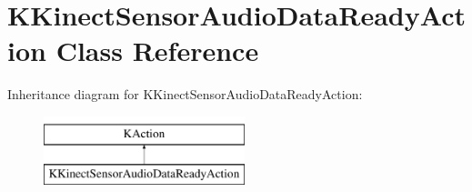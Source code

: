 \hypertarget{class_k_kinect_sensor_audio_data_ready_action}{\section{\-K\-Kinect\-Sensor\-Audio\-Data\-Ready\-Action \-Class \-Reference}
\label{class_k_kinect_sensor_audio_data_ready_action}
}
\-Inheritance diagram for \-K\-Kinect\-Sensor\-Audio\-Data\-Ready\-Action\-:\begin{figure}[H]
\begin{center}
\leavevmode
\includegraphics[height=2.000000cm]{class_k_kinect_sensor_audio_data_ready_action}
\end{center}
\end{figure}
